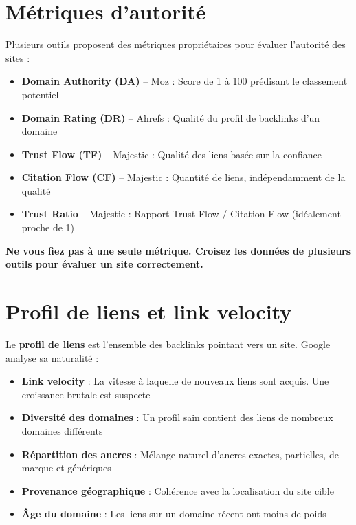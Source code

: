 \documentclass[12pt,a4paper,twoside]{report}
\newcommand{\keyword}[1]{\textbf{\textcolor{googleblue}{#1}}}
\newcommand{\important}[1]{\textbf{\textcolor{googlered}{#1}}}
\begin{document}
\section{Métriques d'autorité}

Plusieurs outils proposent des métriques propriétaires pour évaluer l'autorité des sites :

\begin{itemize}
    \item \textbf{Domain Authority (DA)} -- Moz : Score de 1 à 100 prédisant le classement potentiel
    \item \textbf{Domain Rating (DR)} -- Ahrefs : Qualité du profil de backlinks d'un domaine
    \item \textbf{Trust Flow (TF)} -- Majestic : Qualité des liens basée sur la confiance
    \item \textbf{Citation Flow (CF)} -- Majestic : Quantité de liens, indépendamment de la qualité
    \item \textbf{Trust Ratio} -- Majestic : Rapport Trust Flow / Citation Flow (idéalement proche de 1)
\end{itemize}

\important{Ne vous fiez pas à une seule métrique. Croisez les données de plusieurs outils pour évaluer un site correctement.}

\section{Profil de liens et link velocity}

Le \keyword{profil de liens} est l'ensemble des backlinks pointant vers un site. Google analyse sa naturalité :

\begin{itemize}
    \item \textbf{Link velocity} : La vitesse à laquelle de nouveaux liens sont acquis. Une croissance brutale est suspecte
    \item \textbf{Diversité des domaines} : Un profil sain contient des liens de nombreux domaines différents
    \item \textbf{Répartition des ancres} : Mélange naturel d'ancres exactes, partielles, de marque et génériques
    \item \textbf{Provenance géographique} : Cohérence avec la localisation du site cible
    \item \textbf{Âge du domaine} : Les liens sur un domaine récent ont moins de poids
\end{itemize}
\end{document}
